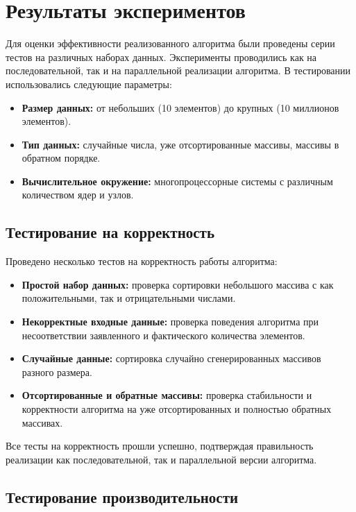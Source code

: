 \documentclass[a4paper,12pt]{article}
\begin{document}
\section{Результаты экспериментов}

Для оценки эффективности реализованного алгоритма были проведены серии тестов на различных наборах данных. Эксперименты проводились как на последовательной, так и на параллельной реализации алгоритма. В тестировании использовались следующие параметры:

\begin{itemize}
    \item \textbf{Размер данных:} от небольших (10 элементов) до крупных (10 миллионов элементов).
    \item \textbf{Тип данных:} случайные числа, уже отсортированные массивы, массивы в обратном порядке.
    \item \textbf{Вычислительное окружение:} многопроцессорные системы с различным количеством ядер и узлов.
\end{itemize}

\subsection{Тестирование на корректность}

Проведено несколько тестов на корректность работы алгоритма:

\begin{itemize}
    \item \textbf{Простой набор данных:} проверка сортировки небольшого массива с как положительными, так и отрицательными числами.
    \item \textbf{Некорректные входные данные:} проверка поведения алгоритма при несоответствии заявленного и фактического количества элементов.
    \item \textbf{Случайные данные:} сортировка случайно сгенерированных массивов разного размера.
    \item \textbf{Отсортированные и обратные массивы:} проверка стабильности и корректности алгоритма на уже отсортированных и полностью обратных массивах.
\end{itemize}

Все тесты на корректность прошли успешно, подтверждая правильность реализации как последовательной, так и параллельной версии алгоритма.

\subsection{Тестирование производительности}
\end{document}
